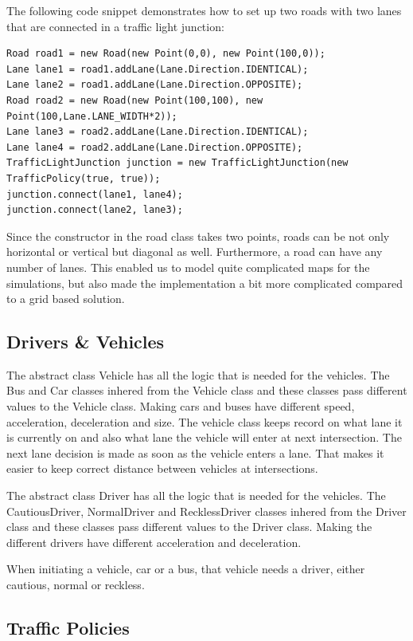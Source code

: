 \documentclass[11pt]{article}
\begin{document}
The following code snippet demonstrates how to set up two roads with two lanes that are connected in a traffic light junction:

\begin{verbatim}
Road road1 = new Road(new Point(0,0), new Point(100,0));
Lane lane1 = road1.addLane(Lane.Direction.IDENTICAL);
Lane lane2 = road1.addLane(Lane.Direction.OPPOSITE);
Road road2 = new Road(new Point(100,100), new Point(100,Lane.LANE_WIDTH*2));
Lane lane3 = road2.addLane(Lane.Direction.IDENTICAL);
Lane lane4 = road2.addLane(Lane.Direction.OPPOSITE);
TrafficLightJunction junction = new TrafficLightJunction(new TrafficPolicy(true, true));
junction.connect(lane1, lane4);
junction.connect(lane2, lane3);
\end{verbatim}

Since the constructor in the road class takes two points, roads can be not only horizontal or vertical but diagonal as well. Furthermore, a road can have any number of lanes. This enabled us to model quite complicated maps for the simulations, but also made the implementation a bit more complicated compared to a grid based solution.

\subsection{Drivers \& Vehicles}
The abstract class Vehicle has all the logic that is needed for the vehicles. The Bus and Car classes inhered from the Vehicle class and these classes pass different values to the Vehicle class. Making cars and buses have different speed, acceleration, deceleration and size. The vehicle class keeps record on what lane it is currently on and also what lane the vehicle will enter at next intersection. The next lane decision is made as soon as the vehicle enters a lane. That makes it easier to keep correct distance between vehicles at intersections.

The abstract class Driver has all the logic that is needed for the vehicles. The CautiousDriver, NormalDriver and RecklessDriver classes inhered from the Driver class and these classes pass different values to the Driver class. Making the different drivers have different acceleration and deceleration.

When initiating a vehicle, car or a bus, that vehicle needs a driver, either cautious, normal or reckless.

\subsection{Traffic Policies}
\end{document}
